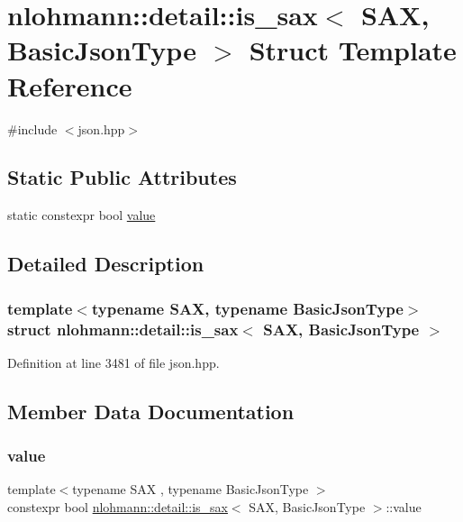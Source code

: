 \hypertarget{structnlohmann_1_1detail_1_1is__sax}{}\section{nlohmann\+::detail\+::is\+\_\+sax$<$ S\+AX, Basic\+Json\+Type $>$ Struct Template Reference}
\label{structnlohmann_1_1detail_1_1is__sax}


{\ttfamily \#include $<$json.\+hpp$>$}

\subsection*{Static Public Attributes}
\begin{DoxyCompactItemize}
\item 
static constexpr bool \mbox{\hyperlink{structnlohmann_1_1detail_1_1is__sax_a8ab7e51087000e948b4a2492257484dc}{value}}
\end{DoxyCompactItemize}


\subsection{Detailed Description}
\subsubsection*{template$<$typename S\+AX, typename Basic\+Json\+Type$>$\newline
struct nlohmann\+::detail\+::is\+\_\+sax$<$ S\+A\+X, Basic\+Json\+Type $>$}



Definition at line 3481 of file json.\+hpp.



\subsection{Member Data Documentation}
\mbox{\label{structnlohmann_1_1detail_1_1is__sax_a8ab7e51087000e948b4a2492257484dc}} 
\subsubsection{\texorpdfstring{value}{value}}
{\footnotesize\ttfamily template$<$typename S\+AX , typename Basic\+Json\+Type $>$ \\
constexpr bool \mbox{\hyperlink{structnlohmann_1_1detail_1_1is__sax}{nlohmann\+::detail\+::is\+\_\+sax}}$<$ S\+AX, Basic\+Json\+Type $>$\+::value\hspace{0.3cm}{\ttfamily [static]}}


